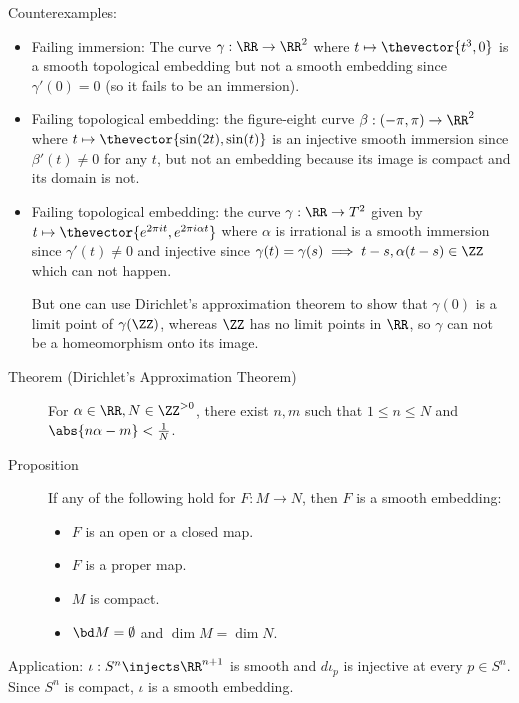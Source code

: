Counterexamples:

\begin{itemize}
\item
  Failing immersion: The curve \(\gamma: \RR \to \RR^2\) where
  \(t\mapsto \thevector{t^3, 0}\) is a smooth topological embedding but
  not a smooth embedding since \(\gamma'(0)= 0\) (so it fails to be an
  immersion).
\item
  Failing topological embedding: the figure-eight curve
  \(\beta: (-\pi ,\pi) \to \RR^2\) where
  \(t\mapsto \thevector{\sin(2t), \sin(t)}\) is an injective smooth
  immersion since \(\beta'(t) \neq 0\) for any \(t\), but not an
  embedding because its image is compact and its domain is not.
\item
  Failing topological embedding: the curve \(\gamma: \RR\to T^2\) given
  by \(t \mapsto \thevector{e^{2\pi i t}, e^{2\pi i \alpha t}}\) where
  \(\alpha\) is irrational is a smooth immersion since
  \(\gamma'(t) \neq 0\) and injective since
  \(\gamma(t) = \gamma(s) \implies t-s, \alpha(t-s) \in \ZZ\) which can
  not happen.

  But one can use Dirichlet's approximation theorem to show that
  \(\gamma(0)\) is a limit point of \(\gamma(\ZZ)\), whereas \(\ZZ\) has
  no limit points in \(\RR\), so \(\gamma\) can not be a homeomorphism
  onto its image.
\end{itemize}

\begin{description}
\item[Theorem (Dirichlet's Approximation Theorem)]
For \(\alpha\in \RR, N\in \ZZ^{> 0}\), there exist \(n, m\) such that
\(1\leq n \leq N\) and \(\abs{n\alpha - m} < {1\over N}\).
\item[Proposition]
If any of the following hold for \(F:M\to N\), then \(F\) is a smooth
embedding:

\begin{itemize}
\tightlist
\item
  \(F\) is an open or a closed map.
\item
  \(F\) is a proper map.
\item
  \(M\) is compact.
\item
  \(\bd M = \emptyset\) and \(\dim M = \dim N\).
\end{itemize}
\end{description}

Application: \(\iota: S^n \injects \RR^{n+1}\) is smooth and
\(d\iota_p\) is injective at every \(p\in S^n\). Since \(S^n\) is
compact, \(\iota\) is a smooth embedding.


